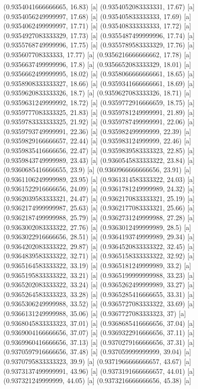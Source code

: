 {{{(0.9354041666666665, 16.83) [a] 
(0.9354052083333331, 17.67) [a] 
(0.9354056249999997, 17.68) [a] 
(0.935405833333333, 17.69) [a] 
(0.9354062499999997, 17.71) [a] 
(0.935408333333333, 17.72) [a] 
(0.9354927083333329, 17.73) [a] 
(0.9355487499999996, 17.74) [a] 
(0.9355768749999996, 17.75) [a] 
(0.9355789583333329, 17.76) [a] 
(0.935607708333333, 17.77) [a] 
(0.9356216666666662, 17.78) [a] 
(0.9356637499999996, 17.8) [a] 
(0.9356652083333329, 18.01) [a] 
(0.9356662499999995, 18.02) [a] 
(0.9358066666666661, 18.65) [a] 
(0.9358908333333327, 18.66) [a] 
(0.9359341666666661, 18.69) [a] 
(0.9359620833333326, 18.7) [a] 
(0.9359627083333326, 18.71) [a] 
(0.9359631249999992, 18.72) [a] 
(0.9359772916666659, 18.75) [a] 
(0.9359777083333325, 21.83) [a] 
(0.9359781249999991, 21.89) [a] 
(0.9359783333333325, 21.92) [a] 
(0.9359787499999991, 22.06) [a] 
(0.9359793749999991, 22.36) [a] 
(0.935982499999999, 22.39) [a] 
(0.9359829166666657, 22.44) [a] 
(0.935983124999999, 22.46) [a] 
(0.9359835416666656, 22.47) [a] 
(0.9359839583333323, 22.85) [a] 
(0.9359843749999989, 23.43) [a] 
(0.9360545833333322, 23.84) [a] 
(0.9360685416666655, 23.9) [a] 
(0.9360966666666656, 23.91) [a] 
(0.9361106249999989, 23.95) [a] 
(0.9361314583333322, 24.03) [a] 
(0.9361522916666656, 24.09) [a] 
(0.9361781249999989, 24.32) [a] 
(0.9362039583333321, 24.47) [a] 
(0.9362170833333321, 25.19) [a] 
(0.9362174999999987, 25.63) [a] 
(0.9362177083333321, 25.66) [a] 
(0.9362187499999988, 25.79) [a] 
(0.9362731249999988, 27.28) [a] 
(0.9363002083333322, 27.76) [a] 
(0.9363012499999989, 28.5) [a] 
(0.9363022916666656, 28.51) [a] 
(0.9364193749999989, 29.34) [a] 
(0.9364202083333322, 29.87) [a] 
(0.9364520833333322, 32.45) [a] 
(0.9364839583333322, 32.71) [a] 
(0.9365158333333322, 32.92) [a] 
(0.9365164583333322, 33.19) [a] 
(0.9365181249999989, 33.2) [a] 
(0.9365195833333322, 33.21) [a] 
(0.9365199999999988, 33.23) [a] 
(0.9365202083333322, 33.24) [a] 
(0.9365262499999989, 33.27) [a] 
(0.9365264583333323, 33.28) [a] 
(0.9365285416666655, 33.31) [a] 
(0.9365306249999988, 33.52) [a] 
(0.9365727083333322, 33.69) [a] 
(0.9366131249999988, 35.06) [a] 
(0.9367727083333323, 37) [a] 
(0.9368045833333323, 37.01) [a] 
(0.9368685416666656, 37.04) [a] 
(0.9369004166666656, 37.07) [a] 
(0.9369322916666656, 37.11) [a] 
(0.9369960416666656, 37.13) [a] 
(0.9370279166666656, 37.31) [a] 
(0.9370597916666656, 37.48) [a] 
(0.937059999999999, 39.04) [a] 
(0.9370795833333323, 39.9) [a] 
(0.9371966666666657, 43.67) [a] 
(0.9373137499999991, 43.96) [a] 
(0.9373191666666657, 44.01) [a] 
(0.937321249999999, 44.05) [a] 
(0.9373216666666656, 45.38) [a] 
}}}
